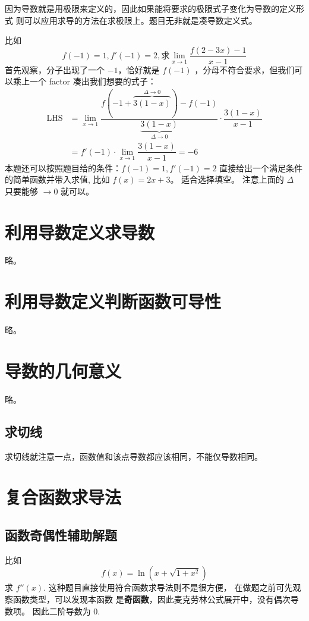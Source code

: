 因为导数就是用极限来定义的，因此如果能将要求的极限式子变化为导数的定义形式
则可以应用求导的方法在求极限上。题目无非就是凑导数定义式。

比如
\[
	f(-1) = 1, f'(-1) = 2, \mbox{求} \lim_{x \to 1 } \dfrac{f(2-3x) - 1}{x-1}
\]
首先观察，分子出现了一个 $-1$，恰好就是 $f(-1)$ ，分母不符合要求，但我们可以乘上一个 factor
凑出我们想要的式子：
\begin{align*}
	\mbox{LHS} &= \lim_{x \to 1 } \dfrac{f(-1+\overbrace{3(1-x)}^{\Delta \to 0}) -
		 f(-1)}{\underbrace{3(1-x)}_{\Delta \to 0}} \cdot \dfrac{3(1-x)}{x-1} \\
		 &= f'(-1) \cdot \lim_{x \to 1} \dfrac{3(1-x)}{x-1} = -6
\end{align*}
本题还可以按照题目给的条件：$f(-1) = 1, f'(-1) = 2$ 直接给出一个满足条件的简单函数并带入求值,
比如 $f(x) = 2x+3$。
适合选择填空。
注意上面的 $\Delta$ 只要能够 $\to 0$ 就可以。

\section{利用导数定义求导数}

略。

\section{利用导数定义判断函数可导性}

略。

\section{导数的几何意义}

略。

\subsection{求切线}

求切线就注意一点，函数值和该点导数都应该相同，不能仅导数相同。

\section{复合函数求导法}

\subsection{函数奇偶性辅助解题}

比如
\[
    f(x) = \ln(x+\sqrt{1+x^2})
\]
求 $f''(x)$.
这种题目直接使用符合函数求导法则不是很方便，
在做题之前可先观察函数类型，可以发现本函数
是\textbf{奇函数}，因此麦克劳林公式展开中，没有偶次导数项。
因此二阶导数为 0.

